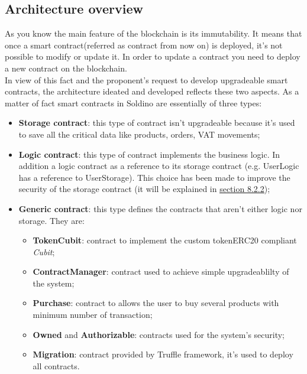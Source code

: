 \subsection{Architecture overview}
As you know the main feature of the blockchain is its immutability. It means that once a smart contract\glosp (referred as contract from now on) is 
deployed, it's not possible to modify or update it. In order to update a contract you need to deploy 
a new contract on the blockchain.\\
In view of this fact and the proponent's request to develop upgradeable smart contracts, the architecture ideated and developed reflects these two aspects. As a matter of fact smart contracts in Soldino
are essentially of three types:
\begin{itemize}
	\item\textbf{Storage contract}: this type of contract isn't upgradeable because it's used
		to save all the critical data like products, orders, VAT movements;
	\item\textbf{Logic contract}: this type of contract implements the business logic. In addition
	a logic contract as a reference to its storage contract (e.g. UserLogic has a reference to UserStorage). This choice has been made to improve the security of the storage contract (it will be explained in \hyperlink{st}{\underline{section 8.2.2}});
	\item\textbf{Generic contract}: this type defines the contracts that aren't either logic nor storage.
	They are:
	\begin{itemize}
		\item\textbf{TokenCubit}: contract to implement the custom token\glosp ERC20 compliant \textit{Cubit};
		\item\textbf{ContractManager}: contract used to achieve simple upgradeablilty of the system;
		\item\textbf{Purchase}: contract to allows the user to buy several products with minimum number of transaction;
		\item\textbf{Owned} and \textbf{Authorizable}: contracts used for the system's security;
		\item\textbf{Migration}: contract provided by Truffle framework\glo, it's used to deploy all contracts. 
	\end{itemize}
\end{itemize}

